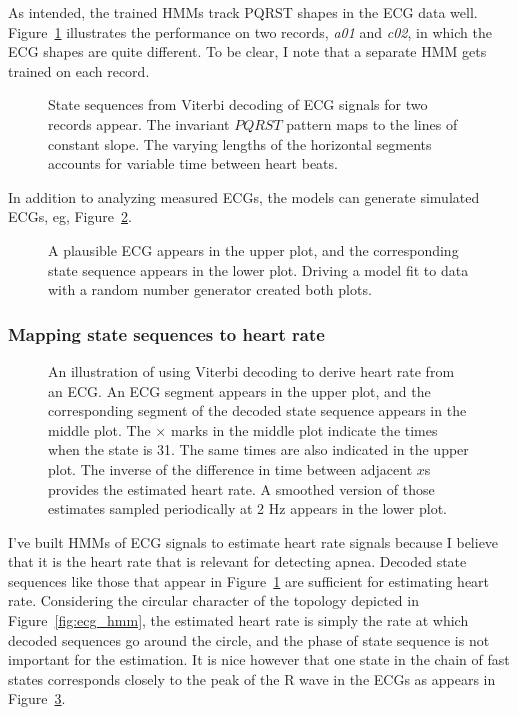 As intended, the trained HMMs track PQRST shapes in the ECG data well.
Figure~\ref{fig:a01c02_states} illustrates the performance on two
records, \emph{a01} and \emph{c02}, in which the ECG shapes are quite
different.  To be clear, I note that a separate HMM gets trained on
each record.
\begin{figure}
  \caption[Decoded state sequences]{State sequences from Viterbi
    decoding of ECG signals for two records appear.  The invariant
    $PQRST$ pattern maps to the lines of constant slope.  The varying
    lengths of the horizontal segments accounts for variable time
    between heart beats.}
  \label{fig:a01c02_states}
\end{figure}

In addition to analyzing measured ECGs, the models can generate
simulated ECGs, eg, Figure~\ref{fig:simulated}.
\begin{figure}
  \caption[Simulated ECG]{A plausible ECG appears in the upper plot,
    and the corresponding state sequence appears in the lower plot.
    Driving a model fit to data with a random number generator created
  both plots.}
  \label{fig:simulated}
\end{figure}

\subsubsection{Mapping state sequences to heart rate}
\label{sec:states2hr}

\begin{figure}
  \caption[Heart rate derived from ECG.]{An illustration of using
    Viterbi decoding to derive heart rate from an ECG.  An ECG segment
    appears in the upper plot, and the corresponding segment of the
    decoded state sequence appears in the middle plot.  The $\times$
    marks in the middle plot indicate the times when the state is 31.
    The same times are also indicated in the upper plot.  The inverse
    of the difference in time between adjacent $x$s provides the
    estimated heart rate.  A smoothed version of those estimates
    sampled periodically at 2 Hz appears in the lower plot. }
  \label{fig:ecg2hr}
\end{figure}

I've built HMMs of ECG signals to estimate heart rate signals because
I believe that it is the heart rate that is relevant for detecting
apnea.  Decoded state sequences like those that appear in
Figure~\ref{fig:a01c02_states} are sufficient for estimating heart
rate.  Considering the circular character of the topology depicted in
Figure~\ref{fig:ecg_hmm}, the estimated heart rate is simply the rate
at which decoded sequences go around the circle, and the phase of
state sequence is not important for the estimation.  It is nice
however that one state in the chain of fast states corresponds closely
to the peak of the R wave in the ECGs as appears in
Figure~\ref{fig:ecg2hr}.


